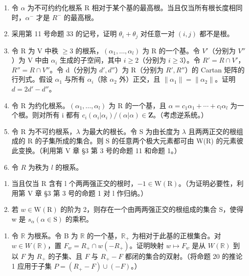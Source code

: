 \begin{enumerate}
\def\labelenumi{\arabic{enumi})}
\setcounter{enumi}{9}
\item
  令 \(\alpha\) 为不可约约化根系 R 相对于某个基的最高根。当且仅当所有根长度相同时，\(\alpha^{-}\) 才是 \(R^{-}\) 的最高根。
\item
  采用第 11 号命题 33 的记号，证明 \(\theta_{i} + \theta_{j}\) 对任意一对 \((i,j)\) 都不是根。
\item
  令 R 为 V 中秩 \(\geqslant 3\) 的根系，\((\alpha_{1},\ldots,\alpha_{l})\) 为 R 的一个基。令 \(V'\)（分别为 \(V''\)）为 V 中由 \(\alpha_{i}\) 生成的子空间，其中 \(i \geqslant 2\)（分别为 \(i \geqslant 3\)）。令 \(R' = R \cap V'\)，\(R'' = R \cap V''\)。令 d（分别为 \(d', d''\)）为 R（分别为 \(R', R''\)）的 Cartan 矩阵的行列式。假设 \(\alpha_{1}\) 与所有 \(\alpha_{i}\)（除 \(\alpha_{2}\) 外）正交，且 \(\| \alpha_{1} \| = \| \alpha_{2} \|\)。证明 \(d = 2d' - d''\)。
\item
  令 R 为约化根系。\((\alpha_{1},\ldots,\alpha_{l})\) 为 R 的一个基，且 \(\alpha=c_{1}\alpha_{1}+\cdots+c_{l}\alpha_{l}\) 为一个根。则对所有 i 都有 \(c_{i}(\alpha_{i}|\alpha_{i})/(\alpha|\alpha)\in\mathbf{Z}\)。（考虑逆系统。）
\item
  令 R 为不可约根系，\(\lambda\) 为最大的根长。令 S 为由长度为 \(\lambda\) 且两两正交的根组成的 R 的子集所成的集合。则 S 的任意两个极大元素都可由 W(R) 的元素彼此变换。（利用第 V 章 §3 第 3 号的命题 11 和命题 1。）
\item
  令 \(R\) 为秩为 \(l\) 的根系。
\end{enumerate}

\begin{enumerate}
\def\labelenumi{\alph{enumi})}
\item
  当且仅当 R 含有 l 个两两强正交的根时，\(-1 \in \mathrm{W}(\mathrm{R})\)。（为证明必要性，利用第 V 章 §3 第 3 号的命题 1 对 l 作归纳。）
\item
  若 \(w \in \mathrm{W}(\mathrm{R})\) 的阶为 2，则存在一个由两两强正交的根组成的集合 S，使得 w 是 \(s_{\alpha} (\alpha \in \mathrm{S})\) 的乘积。
\end{enumerate}

\begin{enumerate}
\def\labelenumi{\arabic{enumi})}
\setcounter{enumi}{15}
\tightlist
\item
  令 \(\mathbb{R}\) 为根系。令 B 为 \(\mathbb{R}\) 的一个基，\(\mathbb{R}_+\) 为相对于此基的正根集合。对 \(w \in W(\mathbb{R})\)，置 \(F_w = R_+ \cap w(-R_+)\)。证明映射 \(w \mapsto F_w\) 是从 \(W(\mathbb{R})\) 到以 \(F\) 为 \(R_+\) 的子集、且 \(F\) 与 \(R_+ - F\) 都闭的集合的双射。（将命题 20 的推论 1 应用于子集 \(P = (R_+ - F) \cup (-F)\)。）
\end{enumerate}

